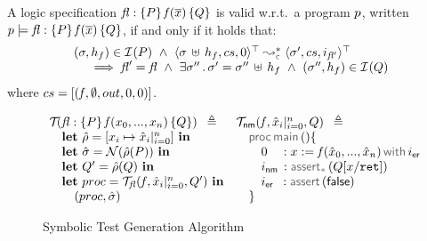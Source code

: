 \begin{definition}
A \jsil logic specification ${\mathit{fl}} : \{ P \} \, \mathit{f}(\overline{x}) \, \{ Q \}$ is valid w.r.t.~a program 
$p$, written $p \models {\ensuremath{\mathit{fl}}} : \{ P \} \, \mathit{f}(\overline{x}) \, \{ Q \}$, if and only if it holds that: 
$$
\begin{array}{l}
   (\jstate, \heap_f) \in \interpret{}{}(P) 
   \ \wedge \ 
    \transabssemrule{\jstate \dunion \heap_f, \cs, 0}{\jstate', \cs, i_{\flag'}}{\top}{\top}{\concrete} \\ \quad \
   \implies
      \flag' = \flag \ \wedge \ \exists \jstate'' \, . \, \jstate' = \jstate'' \dunion \heap_f
          \ \wedge \   (\jstate'', \heap_f) \in \interpret{}{}(Q) 
\end{array}
$$
where $cs = [ (\mathit{f}, \emptyset, out, 0, 0) ]$. 
\end{definition}


\begin{figure}
{\footnotesize
$$
\begin{array}{lll}
\testify{}(\specsig{P}{\pid(\jvar_0, ..., \jvar_n)}{Q}{\flag}) \ \semeq                           &  \testify{\fnormal}(\pid, \svar_i|_{i=0}^n, Q) \ \semeq \\
%
\quad  \mathbf{let} \ \sstore =  [ \jvar_i \mapsto \svar_i|_{i=0}^n] \ \mathbf{in}        &  \quad \darkmath{\sf proc} \jsilmain () \{    \\
%
\quad  \mathbf{let} \ \sstate = \normaliser(\sstore(P)) \ \mathbf{in}                               &   \qquad 0_{\phantom{\sf nm}}: \jsilcall{\jvar}{\pid}{\svar_0, ..., \svar_n}{\errlab} \\
\quad  \mathbf{let} \ Q' = \sstore(Q) \ \mathbf{in}                                                           &  \qquad \retlab \, : \sepassert(Q[\jvar/\retvar])  \\
\quad  \mathbf{let} \ \proc = \testify{\flag}(\pid, \svar_i|_{i=0}^n, Q')  \ \mathbf{in}  &    \qquad \errlab \, \, \, : \jassert(\jfalse)   \\
\qquad (\proc, \sstate)                                                                                                 &  \quad \}  
\end{array}
$$}
\vspace*{-0.4cm}
\caption{\small Symbolic Test Generation Algorithm~\label{fig:test:generation}}
\vspace*{-0.2cm}
\end{figure}

